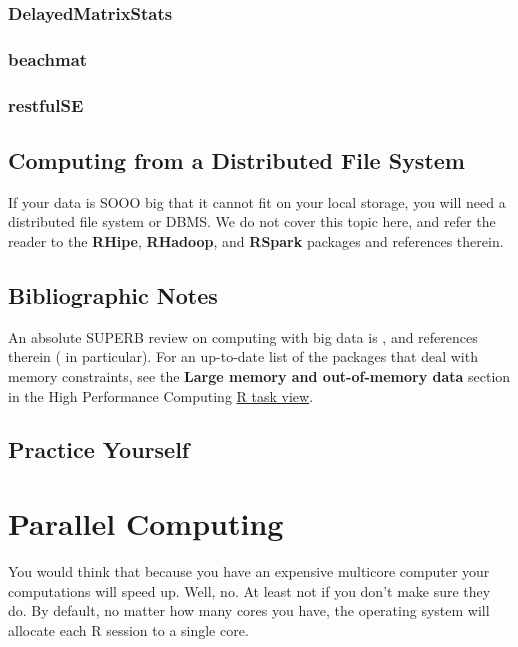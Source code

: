 \documentclass[]{book}
\theoremstyle{definition}
\theoremstyle{definition}
\theoremstyle{definition}
\theoremstyle{remark}
\begin{document}
\subsection{DelayedMatrixStats}\label{delayedmatrixstats}

\subsection{beachmat}\label{beachmat}

\subsection{restfulSE}\label{restfulse}

\section{Computing from a Distributed File
System}\label{computing-from-a-distributed-file-system}

If your data is SOOO big that it cannot fit on your local storage, you
will need a distributed file system or DBMS. We do not cover this topic
here, and refer the reader to the \textbf{RHipe}, \textbf{RHadoop}, and
\textbf{RSpark} packages and references therein.

\section{Bibliographic Notes}\label{bibliographic-notes-11}

An absolute SUPERB review on computing with big data is
\citet{wang2015statistical}, and references therein
(\citet{kane2013scalable} in particular). For an up-to-date list of the
packages that deal with memory constraints, see the \textbf{Large memory
and out-of-memory data} section in the High Performance Computing
\href{https://cran.r-project.org/web/views/HighPerformanceComputing.html}{R
task view}.

\section{Practice Yourself}\label{practice-yourself-12}

\chapter{Parallel Computing}\label{parallel}

You would think that because you have an expensive multicore computer
your computations will speed up. Well, no. At least not if you don't
make sure they do. By default, no matter how many cores you have, the
operating system will allocate each R session to a single core.
\end{document}
